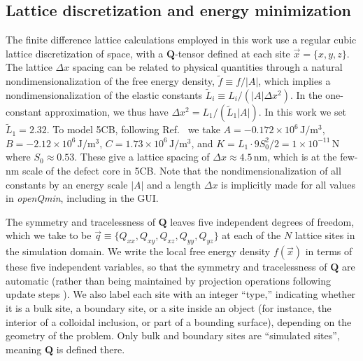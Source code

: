 \documentclass[utf8]{frontiersFPHY} %
\newcommand{\Q}{\mathbf{Q}}
\def\PackageName{\textit{openQmin}}
\begin{document}
\subsection{Lattice discretization and energy minimization}

The finite difference lattice calculations employed in this work use a regular cubic lattice discretization of space, with a $\Q$-tensor defined at each site $\vec{x}=\{x,y,z\}$. The lattice $\Delta x$ spacing can be related to physical quantities through a natural nondimensionalization of the free energy density, $\tilde f\equiv f/|A|$, which  implies a nondimensionalization of  the elastic constants $\tilde L_i\equiv L_i/(|A| \Delta x^2)$. In the one-constant approximation, we thus have $\Delta x^2= L_1/(\tilde L_1 |A|)$.
In this work we set $\tilde L_1 = 2.32$. To model 5CB, following Ref.~\cite{ravnik2009landau} we take $A=-0.172\times10^6\,\mathrm{J}/\mathrm{m}^3$, $B=-2.12\times10^6\,\mathrm{J}/\mathrm{m}^3$, $C=1.73\times10^6\,\mathrm{J}/\mathrm{m}^3$, and $K=L_1 \cdot 9 S_0^2/2=1\times10^{-11}\,\mathrm{N}$ where $S_0\approx 0.53$. These give a lattice spacing of $\Delta x \approx 4.5\,\mathrm{nm}$, which is at the few-nm scale of the defect core in 5CB. Note that the nondimensionalization of all constants by an energy scale $|A|$ and a length $\Delta x$ is implicitly made for all values in \PackageName, including in the GUI.

The symmetry and tracelessness of $\Q$ leaves five independent degrees of freedom, which we take to be $\vec {q} \equiv \{Q_{xx}, Q_{xy}, Q_{xz}, Q_{yy}, Q_{yz}\}$ at each of the $N$ lattice sites in the simulation domain. We write the local free energy density $f(\vec{x})$ in terms of these five independent variables, so that the symmetry and tracelessness of  $\Q$ are automatic (rather than being maintained by projection operations following update steps \citep{ravnik2009landau}). We also label each site with an integer ``type,'' indicating whether it is a bulk site, a boundary site, or a site inside an object (for instance, the interior of a colloidal inclusion, or part of a bounding surface), depending on the geometry of the problem. Only bulk and boundary sites are ``simulated sites'', meaning $\Q$ is defined there.

\end{document}
